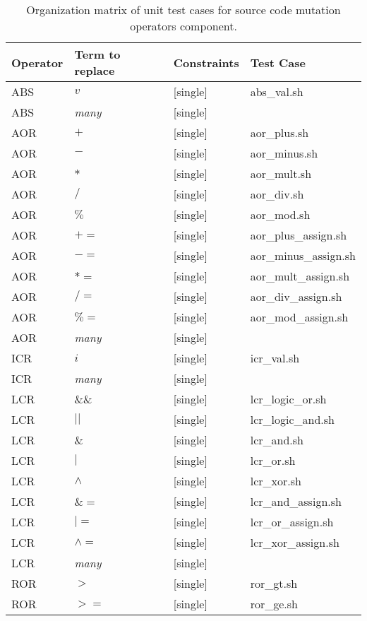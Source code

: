 
\begin{table}[h]
\scriptsize
\centering
\caption{Organization matrix of unit test cases for source code mutation operators component.}
\label{table:operators:categories}

\begin{tabular}{|llll|}
\hline 
\textbf{Operator}	&	\textbf{Term to replace}	&	\textbf{Constraints}	&	\textbf{Test Case} \\
\hline 
ABS	&	$v$	&	[single]	&	abs\_val.sh \\
ABS	&	\textit{many}	&	[single]	&	 \\
AOR	&	$+$	&	[single]	&	aor\_plus.sh \\
AOR	&	$-$	&	[single]	&	aor\_minus.sh \\
AOR	&	$*$	&	[single]	&	aor\_mult.sh \\
AOR	&	$/$	&	[single]	&	aor\_div.sh \\
AOR	&	$\%$	&	[single]	&	aor\_mod.sh \\
AOR	&	$+=$	&	[single]	&	aor\_plus\_assign.sh \\
AOR	&	$-=$	&	[single]	&	aor\_minus\_assign.sh \\
AOR	&	$*=$	&	[single]	&	aor\_mult\_assign.sh \\
AOR	&	$/=$	&	[single]	&	aor\_div\_assign.sh \\
AOR	&	$\%=$	&	[single]	&	aor\_mod\_assign.sh \\
AOR	&	\textit{many}	&	[single]	&	 \\
ICR	&	$i$	&	[single]	&	icr\_val.sh \\
ICR	&	\textit{many}	&	[single]	&	 \\
LCR	&	$\&\&$	&	[single]	&	lcr\_logic\_or.sh \\
LCR	&	$||$	&	[single]	&	lcr\_logic\_and.sh \\
LCR	&	$\&$	&	[single]	&	lcr\_and.sh \\
LCR	&	$|$	&	[single]	&	lcr\_or.sh \\
LCR	&	$\land$	&	[single]	&	lcr\_xor.sh \\
LCR	&	$\&=$	&	[single]	&	lcr\_and\_assign.sh \\
LCR	&	$|=$	&	[single]	&	lcr\_or\_assign.sh \\
LCR	&	$\land=$	&	[single]	&	lcr\_xor\_assign.sh \\
LCR	&	\textit{many}&	[single]	&	 \\
ROR	&	$>$	&	[single]	&	ror\_gt.sh \\
ROR	&	$>=$	&	[single]	&	ror\_ge.sh \\

\end{tabular}
\end{table}
